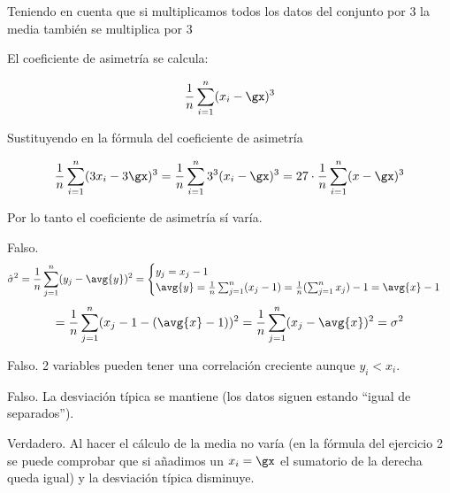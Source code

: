\begin{problem}[5]
\spart  Teniendo en cuenta que si multiplicamos todos los datos del conjunto por $3$ la media también se multiplica por $3$

El coeficiente de asimetría se calcula:

\[\frac{1}{n} \sum_{i=1}^n (x_i-\gx)^3\]

Sustituyendo en la fórmula del coeficiente de asimetría

\[\frac{1}{n} \sum_{i=1}^n (3x_i - 3\gx)^3 = \frac{1}{n} \sum_{i=1}^n 3^3 (x_i-\gx)^3 = 27 \cdot \frac{1}{n} \sum_{i=1}^n (x-\gx)^3\]

Por lo tanto el coeficiente de asimetría sí varía.

\spart Falso. \[ \hat\sigma^2 = \frac{1}{n} \sum_{j=1}^n (y_j - \avg{y})^2 = \begin{cases} y_j = x_j - 1 \\ \avg{y} = \frac{1}{n} \sum_{j=1}^n (x_j - 1) = \frac{1}{n} ( \sum_{j=1}^n x_j ) - 1 = \avg{x} - 1 \end{cases} \]
\[ = \frac{1}{n} \sum_{j=1}^n (x_j - 1 - ( \avg{x} - 1))^2 = \frac{1}{n} \sum_{j=1}^n (x_j - \avg{x})^2  = \sigma^2 \]

\spart Falso. 2 variables pueden tener una correlación creciente aunque $y_i<x_i$.

\spart Falso. La desviación típica se mantiene (los datos siguen estando ``igual de separados'').

\spart Verdadero. Al hacer el cálculo de la media no varía (en la fórmula del ejercicio 2 se puede comprobar que si añadimos un $x_i=\gx$ el sumatorio de la derecha queda igual) y la desviación típica disminuye.

\end{problem}

